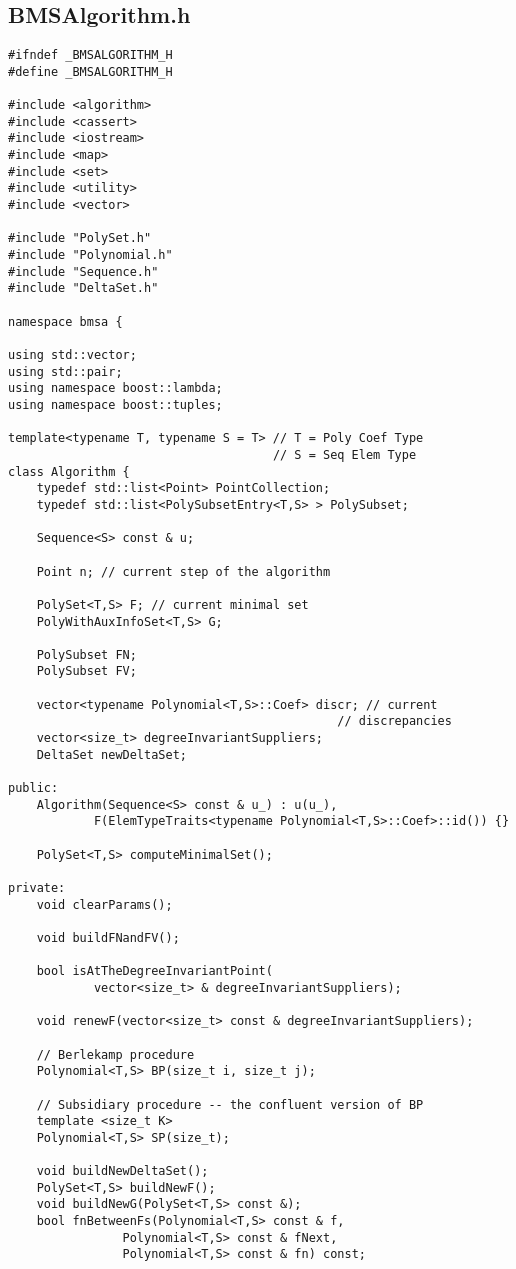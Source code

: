 \subsection*{BMSAlgorithm.h}
\begin{lstlisting}
#ifndef _BMSALGORITHM_H
#define	_BMSALGORITHM_H

#include <algorithm>
#include <cassert>
#include <iostream>
#include <map>
#include <set>
#include <utility>
#include <vector>

#include "PolySet.h"
#include "Polynomial.h"
#include "Sequence.h"
#include "DeltaSet.h"

namespace bmsa {

using std::vector;
using std::pair;
using namespace boost::lambda;
using namespace boost::tuples;

template<typename T, typename S = T> // T = Poly Coef Type
                                     // S = Seq Elem Type
class Algorithm {
    typedef std::list<Point> PointCollection;
    typedef std::list<PolySubsetEntry<T,S> > PolySubset;

    Sequence<S> const & u;

    Point n; // current step of the algorithm

    PolySet<T,S> F; // current minimal set
    PolyWithAuxInfoSet<T,S> G;

    PolySubset FN;
    PolySubset FV;

    vector<typename Polynomial<T,S>::Coef> discr; // current
                                              // discrepancies
    vector<size_t> degreeInvariantSuppliers;
    DeltaSet newDeltaSet;

public:
    Algorithm(Sequence<S> const & u_) : u(u_),
            F(ElemTypeTraits<typename Polynomial<T,S>::Coef>::id()) {}

    PolySet<T,S> computeMinimalSet();

private:
    void clearParams();

    void buildFNandFV();

    bool isAtTheDegreeInvariantPoint(
            vector<size_t> & degreeInvariantSuppliers);

    void renewF(vector<size_t> const & degreeInvariantSuppliers);

    // Berlekamp procedure
    Polynomial<T,S> BP(size_t i, size_t j);

    // Subsidiary procedure -- the confluent version of BP
    template <size_t K>
    Polynomial<T,S> SP(size_t);

    void buildNewDeltaSet();
    PolySet<T,S> buildNewF();
    void buildNewG(PolySet<T,S> const &);
    bool fnBetweenFs(Polynomial<T,S> const & f, 
                Polynomial<T,S> const & fNext,
                Polynomial<T,S> const & fn) const;


\end{lstlisting}
